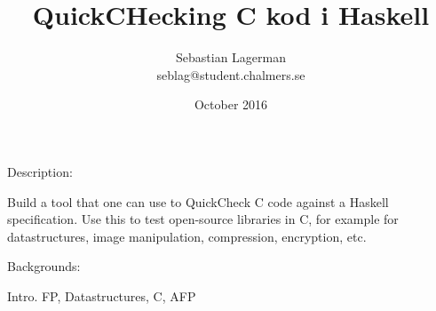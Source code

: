 \documentclass[10,twocolumn]{article}
\title{QuickCHecking C kod i Haskell}
\author{Sebastian Lagerman \\ seblag@student.chalmers.se}
\date{October 2016}
\begin{document}
\maketitle

Description:

Build a tool that one can use to QuickCheck C code against a Haskell specification. Use this to test open-source libraries in C,
for example for datastructures, image manipulation, compression, encryption, etc.

Backgrounds:

Intro. FP, Datastructures, C, AFP











%



%
%
\end{document}
